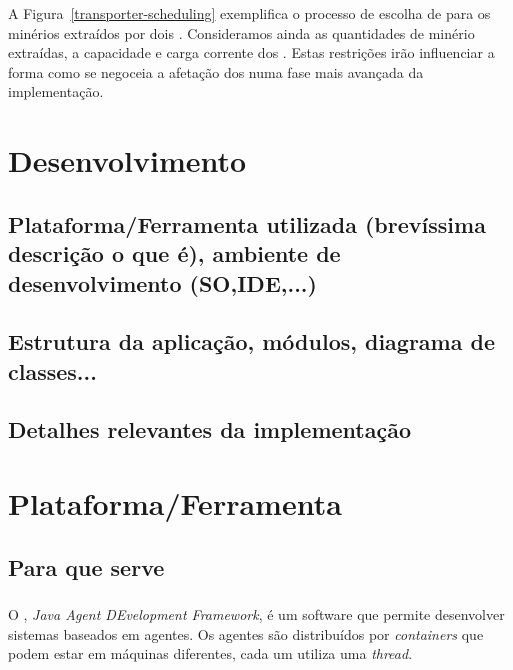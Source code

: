 \documentclass[12pt]{report}
\begin{document}
A Figura~\ref{transporter-scheduling} exemplifica o processo de escolha de \transporters para os minérios extraídos por dois \producers. Consideramos ainda as quantidades de minério extraídas, a capacidade e carga corrente dos \transporters. Estas restrições irão influenciar a forma como se negoceia a afetação dos \transporters numa fase mais avançada da implementação.

\chapter{Desenvolvimento}


\section{Plataforma/Ferramenta utilizada (brevíssima descrição o que é), ambiente de desenvolvimento (SO,IDE,...)}

\section{Estrutura da aplicação, módulos, diagrama de classes...}

\section{Detalhes relevantes da implementação}

\chapter{Plataforma/Ferramenta}


\section{Para que serve}

\subsection{\jade}
O \jade, \emph{Java Agent DEvelopment Framework}, é um software que permite desenvolver sistemas baseados em agentes. Os agentes são distribuídos por \emph{containers} que podem estar em máquinas diferentes, cada um utiliza uma \emph{thread}. 
\end{document}
